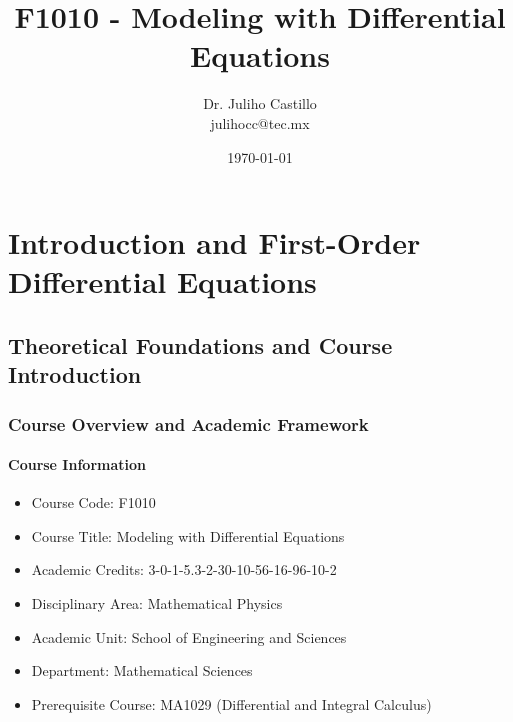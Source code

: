 \documentclass[12pt, letterpaper]{book}
\title{F1010 - Modeling with Differential Equations}
\author{Dr. Juliho Castillo\\julihocc@tec.mx}
\date{\today} %
\begin{document}
\frontmatter %
\maketitle

\tableofcontents

\mainmatter %

\part{Introduction and First-Order Differential Equations}
\label{part:intro_and_first_order_de}

\chapter{Theoretical Foundations and Course Introduction}
\label{chap:introduction}

\section{Course Overview and Academic Framework}

\subsection{Course Information}
\begin{itemize}
    \item Course Code: F1010
    \item Course Title: Modeling with Differential Equations
    \item Academic Credits: 3-0-1-5.3-2-30-10-56-16-96-10-2
    \item Disciplinary Area: Mathematical Physics
    \item Academic Unit: School of Engineering and Sciences
    \item Department: Mathematical Sciences
    \item Prerequisite Course: MA1029 (Differential and Integral Calculus)
\end{itemize}
\end{document}

